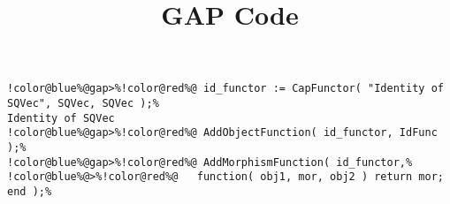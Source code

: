 \documentclass[12pt]{amsart}
\title{GAP Code}
\author{}
\begin{document}
\maketitle

\begin{Verbatim}[commandchars=!@\%,frame=single]
!color@blue%@gap>%!color@red%@ id_functor := CapFunctor( "Identity of SQVec", SQVec, SQVec );%
Identity of SQVec
!color@blue%@gap>%!color@red%@ AddObjectFunction( id_functor, IdFunc );%
!color@blue%@gap>%!color@red%@ AddMorphismFunction( id_functor,%
!color@blue%@>%!color@red%@   function( obj1, mor, obj2 ) return mor; end );%
\end{Verbatim}
\end{document}
